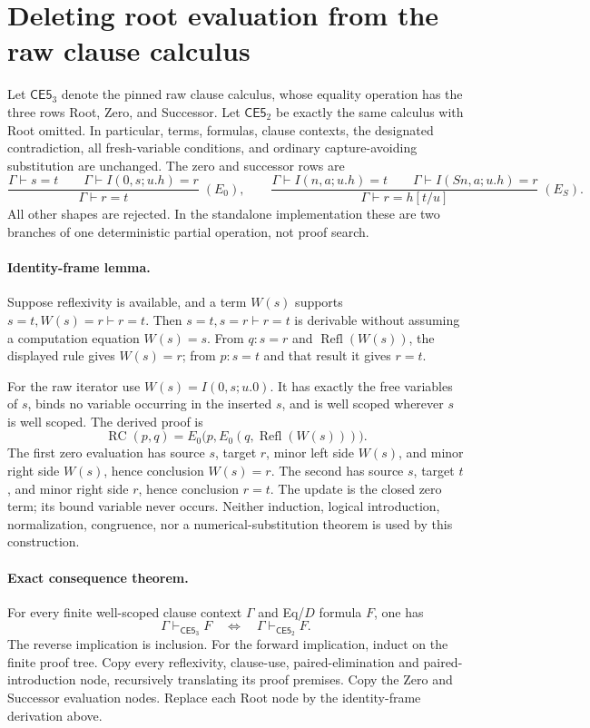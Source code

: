 \section{Deleting root evaluation from the raw clause calculus}
Let $\mathsf{CE5}_3$ denote the pinned raw clause calculus, whose equality
operation has the three rows Root, Zero, and Successor.  Let
$\mathsf{CE5}_2$ be exactly the same calculus with Root omitted.  In
particular, terms, formulas, clause contexts, the designated contradiction,
all fresh-variable conditions, and ordinary capture-avoiding substitution
are unchanged.  The zero and successor rows are
\[
 \frac{\Gamma\vdash s=t\qquad
       \Gamma\vdash I(0,s;u.h)=r}
      {\Gamma\vdash r=t}\;(E_0),
\qquad
 \frac{\Gamma\vdash I(n,a;u.h)=t\qquad
       \Gamma\vdash I(Sn,a;u.h)=r}
      {\Gamma\vdash r=h[t/u]}\;(E_S).
\]
All other shapes are rejected.  In the standalone implementation these
are two branches of one deterministic partial operation, not proof search.

\paragraph{Identity-frame lemma.}
Suppose reflexivity is available, and a term $W(s)$ supports
$s=t,W(s)=r\vdash r=t$.  Then $s=t,s=r\vdash r=t$ is derivable without
assuming a computation equation $W(s)=s$.  From $q:s=r$ and
$\operatorname{Refl}(W(s))$, the displayed rule gives $W(s)=r$;
from $p:s=t$ and that result it gives $r=t$.

For the raw iterator use $W(s)=I(0,s;u.0)$.  It has exactly the free
variables of $s$, binds no variable occurring in the inserted $s$, and
is well scoped wherever $s$ is well scoped.  The derived proof is
\[
 \operatorname{RC}(p,q)=
 E_0\bigl(p,E_0(q,\operatorname{Refl}(W(s)))\bigr).
\]
The first zero evaluation has source $s$, target $r$, minor left side
$W(s)$, and minor right side $W(s)$, hence conclusion $W(s)=r$.
The second has source $s$, target $t$, and minor right side $r$,
hence conclusion $r=t$.  The update is the closed zero term; its bound
variable never occurs.  Neither induction, logical introduction,
normalization, congruence, nor a numerical-substitution theorem is
used by this construction.

\paragraph{Exact consequence theorem.}
For every finite well-scoped clause context $\Gamma$ and Eq/$D$ formula
$F$, one has
\[
 \Gamma\vdash_{\mathsf{CE5}_3}F
 \quad\Longleftrightarrow\quad
 \Gamma\vdash_{\mathsf{CE5}_2}F.
\]
The reverse implication is inclusion.  For the forward implication,
induct on the finite proof tree.  Copy every reflexivity, clause-use,
paired-elimination and paired-introduction node, recursively translating
its proof premises.  Copy the Zero and Successor evaluation nodes.
Replace each Root node by the identity-frame derivation above.

